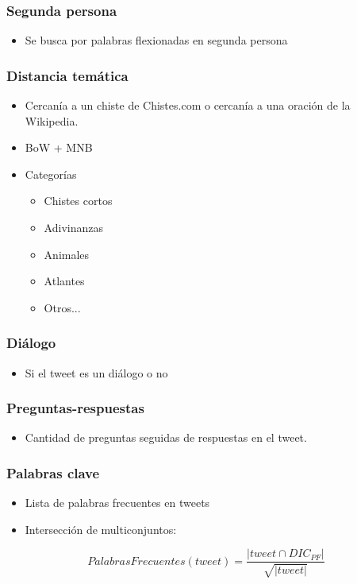 \begin{frame}
    \frametitle{Segunda persona}

    \begin{itemize}
        \item Se busca por palabras flexionadas en segunda persona
    \end{itemize}
\end{frame}

\begin{frame}
    \frametitle{Distancia temática}

    \begin{itemize}[<+->]
        \item Cercanía a un chiste de Chistes.com o cercanía a una oración de la Wikipedia.
        \item BoW + MNB
        \item Categorías
        \begin{itemize}[<+->]
            \item Chistes cortos
            \item Adivinanzas
            \item Animales
            \item Atlantes
            \item Otros...
        \end{itemize}
    \end{itemize}
\end{frame}

\begin{frame}
    \frametitle{Diálogo}

    \begin{itemize}
        \item Si el tweet es un diálogo o no
    \end{itemize}
\end{frame}

\begin{frame}
    \frametitle{Preguntas-respuestas}

    \begin{itemize}
        \item Cantidad de preguntas seguidas de respuestas en el tweet.
    \end{itemize}
\end{frame}

\begin{frame}
    \frametitle{Palabras clave}

    \begin{itemize}
        \item Lista de palabras frecuentes en tweets
        \item Intersección de multiconjuntos:
    \end{itemize}

    \begin{center}
        \[
            PalabrasFrecuentes(tweet) = \frac{|tweet \cap DIC_{PF}|}{\sqrt{|tweet|}}
        \]
    \end{center}
\end{frame}

